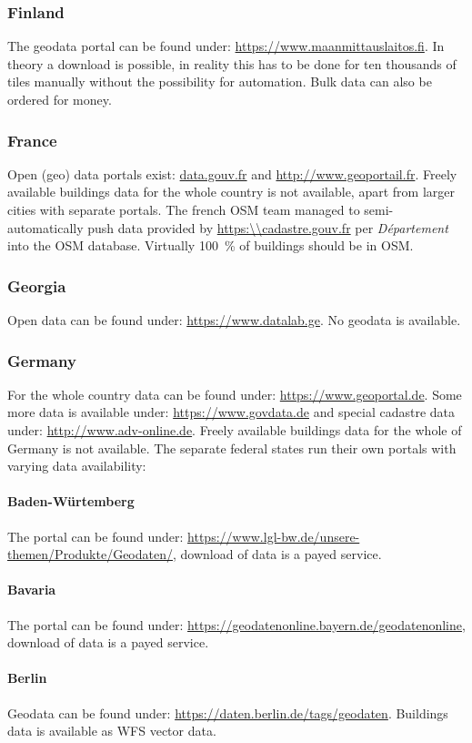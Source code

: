 \documentclass[final, 3p, times, 12pt]{elsarticle} %
\begin{document}
\subsubsection{Finland}
The geodata portal can be found under: \url{https://www.maanmittauslaitos.fi}. In theory a download is possible, in reality this has to be done for ten thousands of tiles manually without the possibility for automation. Bulk data can also be ordered for money.
\subsubsection{France}
Open (geo) data portals exist: \url{data.gouv.fr} and \url{http://www.geoportail.fr}. Freely available buildings data for the whole country is not available, apart from larger cities with separate portals. The french OSM team managed to semi-automatically push data provided by \url{https:\\cadastre.gouv.fr} per \emph{Département} into the OSM database. Virtually \SI{100}{\percent} of buildings should be in OSM.
\subsubsection{Georgia}
Open data can be found under: \url{https://www.datalab.ge}. No geodata is available.
\subsubsection{Germany}
For the whole country data can be found under: \url{https://www.geoportal.de}. Some more data is available under: \url{https://www.govdata.de} and special cadastre data under: \url{http://www.adv-online.de}.
Freely available buildings data for the whole of Germany is not available. The separate federal states run their own portals with varying data availability:
\paragraph{Baden-Würtemberg}
The portal can be found under: \url{https://www.lgl-bw.de/unsere-themen/Produkte/Geodaten/}, download of data is a payed service.
\paragraph{Bavaria}
The portal can be found under: \url{https://geodatenonline.bayern.de/geodatenonline}, download of data is a payed service.
\paragraph{Berlin}
Geodata can be found under: \url{https://daten.berlin.de/tags/geodaten}. Buildings data is available as WFS vector data.
\end{document}
